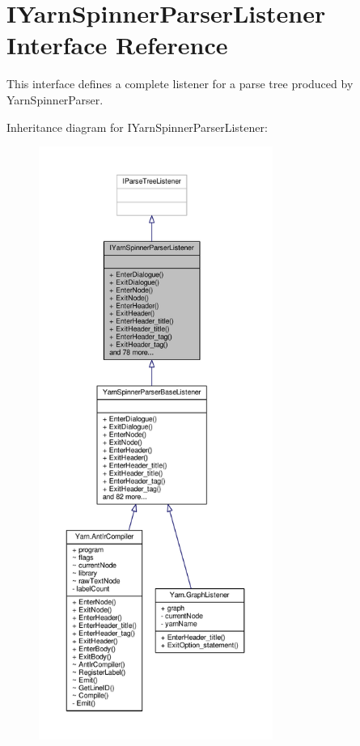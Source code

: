 \hypertarget{a00118}{\section{I\-Yarn\-Spinner\-Parser\-Listener Interface Reference}
\label{a00118}
}


This interface defines a complete listener for a parse tree produced by Yarn\-Spinner\-Parser.  




Inheritance diagram for I\-Yarn\-Spinner\-Parser\-Listener\-:
\nopagebreak
\begin{figure}[H]
\begin{center}
\leavevmode
\includegraphics[height=550pt]{a00387}
\end{center}
\end{figure}


